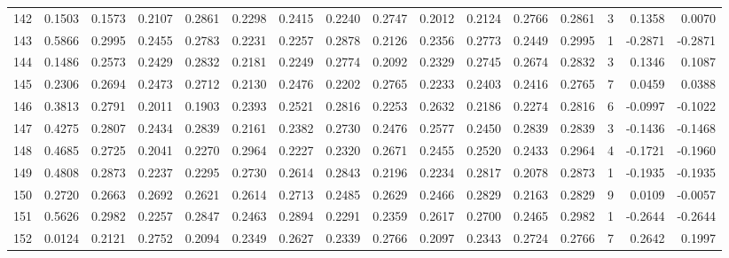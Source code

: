 \begin{tabular}{lrrrrrrrrrrrrrrr}
142 &      0.1503 &  0.1573 &  0.2107 &  0.2861 &  0.2298 &  0.2415 &  0.2240 &  0.2747 &  0.2012 &  0.2124 &   0.2766 &     0.2861 &      3 &                    0.1358 &                     0.0070 \\
143 &      0.5866 &  0.2995 &  0.2455 &  0.2783 &  0.2231 &  0.2257 &  0.2878 &  0.2126 &  0.2356 &  0.2773 &   0.2449 &     0.2995 &      1 &                   -0.2871 &                    -0.2871 \\
144 &      0.1486 &  0.2573 &  0.2429 &  0.2832 &  0.2181 &  0.2249 &  0.2774 &  0.2092 &  0.2329 &  0.2745 &   0.2674 &     0.2832 &      3 &                    0.1346 &                     0.1087 \\
145 &      0.2306 &  0.2694 &  0.2473 &  0.2712 &  0.2130 &  0.2476 &  0.2202 &  0.2765 &  0.2233 &  0.2403 &   0.2416 &     0.2765 &      7 &                    0.0459 &                     0.0388 \\
146 &      0.3813 &  0.2791 &  0.2011 &  0.1903 &  0.2393 &  0.2521 &  0.2816 &  0.2253 &  0.2632 &  0.2186 &   0.2274 &     0.2816 &      6 &                   -0.0997 &                    -0.1022 \\
147 &      0.4275 &  0.2807 &  0.2434 &  0.2839 &  0.2161 &  0.2382 &  0.2730 &  0.2476 &  0.2577 &  0.2450 &   0.2839 &     0.2839 &      3 &                   -0.1436 &                    -0.1468 \\
148 &      0.4685 &  0.2725 &  0.2041 &  0.2270 &  0.2964 &  0.2227 &  0.2320 &  0.2671 &  0.2455 &  0.2520 &   0.2433 &     0.2964 &      4 &                   -0.1721 &                    -0.1960 \\
149 &      0.4808 &  0.2873 &  0.2237 &  0.2295 &  0.2730 &  0.2614 &  0.2843 &  0.2196 &  0.2234 &  0.2817 &   0.2078 &     0.2873 &      1 &                   -0.1935 &                    -0.1935 \\
150 &      0.2720 &  0.2663 &  0.2692 &  0.2621 &  0.2614 &  0.2713 &  0.2485 &  0.2629 &  0.2466 &  0.2829 &   0.2163 &     0.2829 &      9 &                    0.0109 &                    -0.0057 \\
151 &      0.5626 &  0.2982 &  0.2257 &  0.2847 &  0.2463 &  0.2894 &  0.2291 &  0.2359 &  0.2617 &  0.2700 &   0.2465 &     0.2982 &      1 &                   -0.2644 &                    -0.2644 \\
152 &      0.0124 &  0.2121 &  0.2752 &  0.2094 &  0.2349 &  0.2627 &  0.2339 &  0.2766 &  0.2097 &  0.2343 &   0.2724 &     0.2766 &      7 &                    0.2642 &                     0.1997 \\

\end{tabular}
